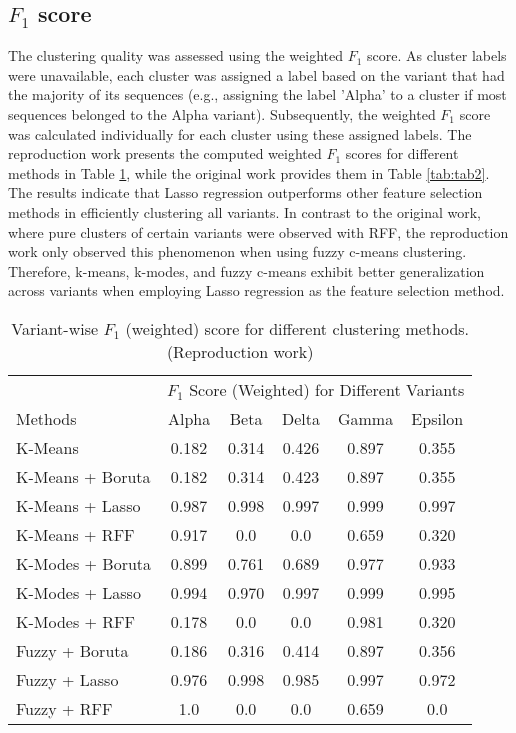 \documentclass[%
 aip,
 jmp,%
 amsmath,amssymb,
 reprint,%
]{revtex4-2}
\begin{document}
\subsection{$F_1$ score}
The clustering quality was assessed using the weighted $F_1$ score. As cluster labels were unavailable,
each cluster was assigned a label based on the variant that had the majority of its sequences (e.g.,
assigning the label 'Alpha' to a cluster if most sequences belonged to the Alpha variant). Subsequently,
the weighted $F_1$ score was calculated individually for each cluster using these assigned labels. 
The reproduction work presents the computed weighted $F_1$ scores for different methods in Table \ref{tab:tab1},
while the original work provides them in Table \ref{tab:tab2}. The results indicate that Lasso regression outperforms
other feature selection methods in efficiently clustering all variants. In contrast to the original work,
where pure clusters of certain variants were observed with RFF, the reproduction work only observed
this phenomenon when using fuzzy c-means clustering. Therefore, k-means, k-modes, and fuzzy c-means exhibit better
generalization across variants when employing Lasso regression as the feature selection method.
\begin{table}
    \centering
    \caption{Variant-wise $F_1$ (weighted) score for different clustering methods. (Reproduction work)}
    \begin{tabular}{lccccc}
        \toprule
        & \multicolumn{5}{c}{$F_1$ Score (Weighted) for Different Variants}\\
        \cmidrule{2-6}
        Methods & Alpha & Beta & Delta & Gamma & Epsilon \\
        \midrule
        \midrule
        K-Means            & 0.182 & 0.314 & 0.426 & 0.897 & 0.355\\
        K-Means + Boruta   & 0.182 & 0.314 & 0.423 & 0.897 & 0.355\\
        K-Means + Lasso    & 0.987 & 0.998 & 0.997 & 0.999 & 0.997\\ 
        K-Means + RFF      & 0.917 & 0.0 & 0.0 & 0.659 & 0.320\\ 
        \midrule
        K-Modes + Boruta   & 0.899 & 0.761 & 0.689 & 0.977 & 0.933\\
        K-Modes + Lasso    & 0.994 & 0.970 & 0.997 & 0.999 & 0.995\\ 
        K-Modes + RFF      & 0.178 & 0.0 & 0.0 & 0.981 & 0.320\\ 
        \midrule
        Fuzzy + Boruta   & 0.186 & 0.316 & 0.414 & 0.897 & 0.356\\
        Fuzzy + Lasso    & 0.976 & 0.998 & 0.985 & 0.997 & 0.972\\ 
        Fuzzy + RFF      & 1.0 & 0.0 & 0.0 & 0.659 & 0.0\\ 
        \bottomrule
    \end{tabular}
    \label{tab:tab1}
\end{table}
\end{document}
